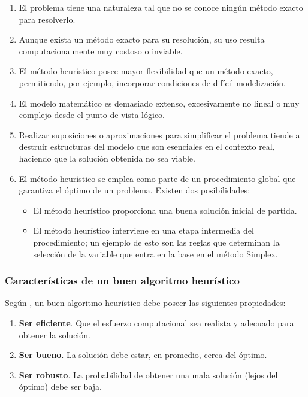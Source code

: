 \documentclass[12pt,titlepage,twoside,openright]{book}
\begin{document}
\begin{enumerate}[label=\alph*.]
	\item El problema tiene una naturaleza tal que no se conoce ningún método exacto para resolverlo.
	\item Aunque exista un método exacto para su resolución, su uso resulta computacionalmente muy costoso o inviable.
	\item El método heurístico posee mayor flexibilidad que un método exacto, permitiendo, por ejemplo, incorporar condiciones de difícil modelización.
	\item El modelo matemático es demasiado extenso, excesivamente no lineal o muy complejo desde el punto de vista lógico.
	\item Realizar suposiciones o aproximaciones para simplificar el problema tiende a destruir estructuras del modelo que son esenciales en el contexto real, haciendo que la solución obtenida no sea viable.
	\item El método heurístico se emplea como parte de un procedimiento global que garantiza el óptimo de un problema. Existen dos posibilidades:
	      \begin{itemize}
		      \item El método heurístico proporciona una buena solución inicial de partida.
		      \item El método heurístico interviene en una etapa intermedia del procedimiento; un ejemplo de esto son las reglas que determinan la selección de la variable que entra en la base en el método Simplex.
	      \end{itemize}
\end{enumerate}

\subsubsection{Características de un buen algoritmo heurístico}

Según \citep{antonioSuarez2014}, un buen algoritmo heurístico debe poseer las siguientes propiedades:

\begin{enumerate}[label=\alph*.]
	\item \textbf{Ser eficiente}. Que el esfuerzo computacional sea realista y adecuado para obtener la solución.
	\item \textbf{Ser bueno}. La solución debe estar, en promedio, cerca del óptimo.
	\item \textbf{Ser robusto}. La probabilidad de obtener una mala solución (lejos del óptimo) debe ser baja.
\end{enumerate}
\end{document}
